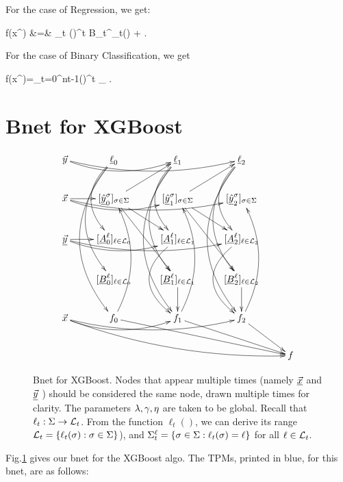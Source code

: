 For the case of Regression, we get:

\beqa
f(x^\s)
&=&
\sum_t (\eta)^t
{B_t^{\ell_t(\s)} + \lam}
\;.
\eeqa

For the case of Binary Classification,
 we get

\beq
f(x^\s)=\sum_{t=0}^{nt-1}(\eta)^t
_{}
\;.
\eeq

\section{Bnet for XGBoost}




\begin{figure}[h!]
$$
\xymatrix{
\vec{y}\ar@/_1pc/[rr]\ar@/_1pc/[rrr]
&\ul{\ell}_0 \ar@/_2pc/[dd]\ar@/_2.5pc/[ddd]\ar@/_3pc/[dddd]
&\ul{\ell}_1 \ar@/_2pc/[dd]\ar@/_2.5pc/[ddd]\ar@/_3pc/[dddd]
&\ul{\ell}_2 \ar@/_2pc/[dd]\ar@/_2.5pc/[ddd]\ar@/_3pc/[dddd]
\\
\vec{x}\ar[r]\ar@/_1pc/[rr]\ar@/_1pc/[rrr]
&[\ul{\haty}^\s_0]_{\s\in\Sigma}\ar[rdd]
\ar[rd]\ar[ru]
&
[\ul{\haty}^\s_1]_{\s\in\Sigma}\ar[rdd]
\ar[rd]\ar[ru]
&
[\ul{\haty}^\s_2]_{\s\in\Sigma}
\\
\ul{\vecy}\ar[r]\ar@/_1pc/[rr]\ar@/_1pc/[rrr]
&[\ul{A}^\ell_0]_{\ell\in\call_0}
&
[\ul{A}^\ell_1]_{\ell\in\call_1}\ar@/_2.5pc/[dd]
&
[\ul{A}^\ell_2]_{\ell\in\call_2}\ar@/_2.5pc/[dd]
\\
&[\ul{B}^\ell_0]_{\ell\in\call_0}
&
[\ul{B}^\ell_1]_{\ell\in\call_1}\ar[d]
&
[\ul{B}^\ell_2]_{\ell\in\call_2}\ar[d]
\\
\vec{x}\ar@/_1pc/[drrrr]
\ar@/_1pc/[rr]\ar@/_1pc/[rrr]
&f_0\ar[drrr]\ar@/_1.5pc/[uuu]
&f_1\ar[drr]\ar@/_1.5pc/[uuu]
&f_2\ar[dr]\ar@/_1.5pc/[uuu]
\\
&&&&f
}$$
\caption{Bnet for XGBoost. Nodes that appear
multiple
times (namely $\underline{{\vec{x}}}$ and $\underline{{\vec{y}}}$ )
should be considered the same node,
drawn multiple times for  clarity.
The parameters $\lambda, \gamma, \eta$ are 
taken to be global. Recall that
$\ell_t:\Sigma\rightarrow {\cal L}_t$.
From the function $\ell_t()$, we can derive
its range ${\cal L}_t=\{\ell_t(\sigma):\sigma\in\Sigma\}$),
and 
$\Sigma^\ell_t=\{\sigma\in\Sigma: \ell_t(\sigma)=\ell\}
$ for all $\ell\in {\cal L}_t$.}
\label{fig-xgb-bnet}
\end{figure}

Fig.\ref{fig-xgb-bnet}
gives our bnet for the XGBoost algo.
The TPMs, printed in blue,
for this bnet, are as follows:


